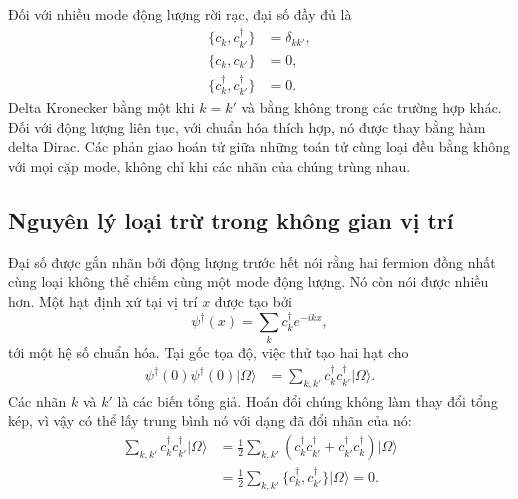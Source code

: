 Đối với nhiều mode động lượng rời rạc, đại số đầy đủ là
\begin{align}
\{c_k,c_{k'}^\dagger\}&=\delta_{kk'},
\\
\{c_k,c_{k'}\}&=0,
\\
\{c_k^\dagger,c_{k'}^\dagger\}&=0.
\end{align}
Delta Kronecker bằng một khi \(k=k'\) và bằng không trong các trường hợp khác. Đối với động lượng liên tục, với chuẩn hóa thích hợp, nó được thay bằng hàm delta Dirac. Các phản giao hoán tử giữa những toán tử cùng loại đều bằng không với mọi cặp mode, không chỉ khi các nhãn của chúng trùng nhau.

\subsection{Nguyên lý loại trừ trong không gian vị trí}

Đại số được gắn nhãn bởi động lượng trước hết nói rằng hai fermion đồng nhất cùng loại không thể chiếm cùng một mode động lượng. Nó còn nói được nhiều hơn. Một hạt định xứ tại vị trí \(x\) được tạo bởi
\begin{equation}
\psi^\dagger(x)=\sum_k c_k^\dagger e^{-ikx},
\end{equation}
tới một hệ số chuẩn hóa. Tại gốc tọa độ, việc thử tạo hai hạt cho
\begin{align}
\psi^\dagger(0)\psi^\dagger(0)|\Omega\rangle
&=\sum_{k,k'}c_k^\dagger c_{k'}^\dagger|\Omega\rangle.
\end{align}
Các nhãn \(k\) và \(k'\) là các biến tổng giả. Hoán đổi chúng không làm thay đổi tổng kép, vì vậy có thể lấy trung bình nó với dạng đã đổi nhãn của nó:
\begin{align}
\sum_{k,k'}c_k^\dagger c_{k'}^\dagger|\Omega\rangle
&=\frac12\sum_{k,k'}
\left(c_k^\dagger c_{k'}^\dagger
+c_{k'}^\dagger c_k^\dagger\right)|\Omega\rangle
\\
&=\frac12\sum_{k,k'}
\{c_k^\dagger,c_{k'}^\dagger\}|\Omega\rangle
=0.
\end{align}

\begin{classroomqa}
\end{classroomqa}

